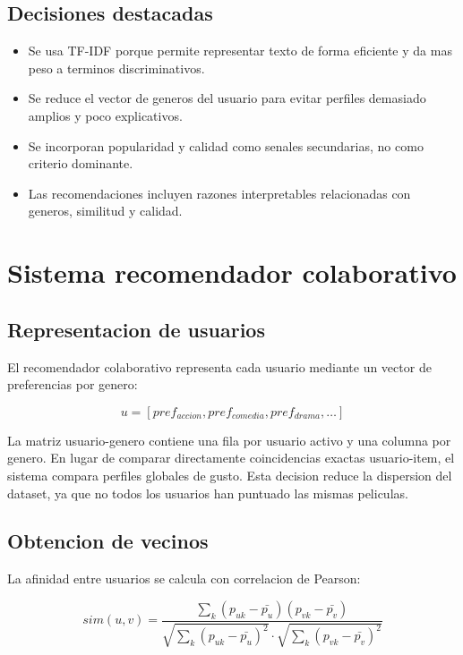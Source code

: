 \documentclass[12pt,a4paper]{article}
\begin{document}
\subsection{Decisiones destacadas}

\begin{itemize}[leftmargin=*]
\item Se usa TF-IDF porque permite representar texto de forma eficiente y da mas peso a terminos discriminativos.
\item Se reduce el vector de generos del usuario para evitar perfiles demasiado amplios y poco explicativos.
\item Se incorporan popularidad y calidad como senales secundarias, no como criterio dominante.
\item Las recomendaciones incluyen razones interpretables relacionadas con generos, similitud y calidad.
\end{itemize}

\section{Sistema recomendador colaborativo}

\subsection{Representacion de usuarios}

El recomendador colaborativo representa cada usuario mediante un vector de preferencias por genero:

\[
u = [pref_{accion}, pref_{comedia}, pref_{drama}, \ldots]
\]

La matriz usuario-genero contiene una fila por usuario activo y una columna por genero. En lugar de comparar directamente coincidencias exactas usuario-item, el sistema compara perfiles globales de gusto. Esta decision reduce la dispersion del dataset, ya que no todos los usuarios han puntuado las mismas peliculas.

\subsection{Obtencion de vecinos}

La afinidad entre usuarios se calcula con correlacion de Pearson:

\[
sim(u,v) =
\frac{\sum_k (p_{uk} - \bar{p_u})(p_{vk} - \bar{p_v})}
{\sqrt{\sum_k (p_{uk} - \bar{p_u})^2} \cdot \sqrt{\sum_k (p_{vk} - \bar{p_v})^2}}
\]
\end{document}
